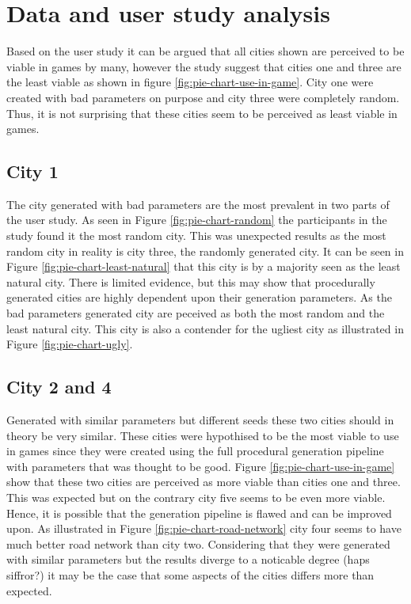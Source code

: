 \section{Data and user study analysis}
	Based on the user study it can be argued that all cities shown are perceived to be viable in games by many, however the study suggest that cities one and three are the least viable as shown in figure \ref{fig:pie-chart-use-in-game}. City one were created with bad parameters on purpose and city three were completely random. Thus, it is not surprising that these cities seem to be perceived as least viable in games.
	
	\subsection{City 1}
		The city generated with bad parameters are the most prevalent in two parts of the user study. As seen in Figure \ref{fig:pie-chart-random} the participants in the study found it the most random city. This was unexpected results as the most random city in reality is city three, the randomly generated city. It can be seen in Figure \ref{fig:pie-chart-least-natural} that this city is by a majority seen as the least natural city. There is limited evidence, but this may show that procedurally generated cities are highly dependent upon their generation parameters. As the bad parameters generated city are peceived as both the most random and the least natural city. This city is also a contender for the ugliest city as illustrated in Figure \ref{fig:pie-chart-ugly}.
		
	\subsection{City 2 and 4}
		Generated with similar parameters but different seeds these two cities should in theory be very similar. These cities were hypothised to be the most viable to use in games since they were created using the full procedural generation pipeline with parameters that was thought to be good. Figure \ref{fig:pie-chart-use-in-game} show that these two cities are perceived as more viable than cities one and three. This was expected but on the contrary city five seems to be even more viable. Hence, it is possible that the generation pipeline is flawed and can be improved upon. As illustrated in Figure \ref{fig:pie-chart-road-network} city four seems to have much better road network than city two. Considering that they were generated with similar parameters but the results diverge to a noticable degree (haps siffror?) it may be the case that some aspects of the cities differs more than expected.
